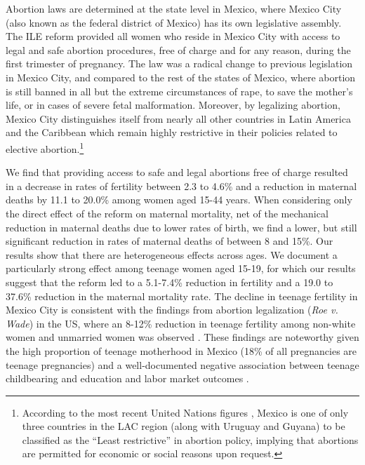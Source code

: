 \documentclass[a4paper, 11pt]{article}
\begin{document}
\begin{spacing}{2}
Abortion laws are determined at the state level in Mexico, where Mexico City (also known as the federal district of Mexico) has its own legislative assembly.  The ILE reform provided all women who reside in Mexico City with access to legal and safe abortion procedures, free of charge and for any reason, during the first trimester of pregnancy. The law was a radical change to previous legislation in Mexico City, and compared to the rest of the states of Mexico, where abortion is still banned in all but the extreme circumstances of rape, to save the mother's life, or in cases of severe fetal malformation. Moreover, by legalizing abortion, Mexico City distinguishes itself from nearly all other countries in Latin America and the Caribbean which remain highly restrictive in their policies related to elective abortion.\footnote{According to the most recent United Nations figures \citep{UN2014}, Mexico is one of only three countries in the LAC region (along with Uruguay and Guyana) to be classified as the ``Least restrictive'' in abortion policy, implying that abortions are permitted for economic or social reasons upon request.}

We find that providing access to safe and legal abortions free of charge resulted in a decrease in rates of fertility between 2.3 to 4.6\% and a reduction in maternal deaths by 11.1 to 20.0\% among women aged 15-44 years.  When considering only the direct effect of the reform on maternal mortality, net of the mechanical reduction in maternal deaths due to lower rates of birth, we find a lower, but still significant reduction in rates of maternal deaths of between 8 and 15\%.   Our results show that there are heterogeneous effects across ages. We document a particularly strong effect among teenage women aged 15-19, for which our results suggest that the reform led to a 5.1-7.4\% reduction in fertility and a 19.0 to 37.6\% reduction in the maternal mortality rate. The decline in teenage fertility in Mexico City is consistent with the findings from abortion legalization (\textit{Roe v. Wade}) in the US, where an 8-12\% reduction in teenage fertility among non-white women and unmarried women was observed \citep{AngristEvans}. These findings are noteworthy given the high proportion of teenage motherhood in Mexico (18\% of all pregnancies are teenage pregnancies) and a well-documented negative association between teenage childbearing and education and labor market outcomes \citep{furstenberg1976unplanned}. 


\end{spacing}
\end{document}
